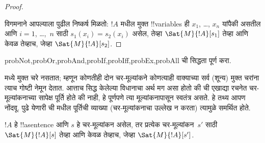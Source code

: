\documentclass[../../../include/open-logic-section]{subfiles}
\begin{document}
\begin{proof}
\begin{enumerate}
%
\end{enumerate}
विगमनाने आपल्याला पुढील निष्कर्ष मिळतो: $!A$ मधील मुक्त !!{variable}s
ही $x_1$, \dots, $x_n$ यांपैकी असतील आणि $i = 1$, \dots,~$n$ साठी
$s_1(x_i)=s_2(x_i)$ असेल, तेव्हा $\Sat{M}{!A}[s_1]$ तेव्हा आणि केवळ
तेव्हाच, जेव्हा $\Sat{M}{!A}[s_2]$.
\end{proof}

\begin{probtag}{probNot,probOr,probAnd,probIf,probIff,probEx,probAll}
 ची सिद्धता पूर्ण करा.
\end{probtag}

\begin{explain}
मध्ये मुक्त चरे नसतात; म्हणून कोणतीही दोन चर-मूल्यांकने
कोणत्याही वाक्याच्या सर्व (शून्य) मुक्त चरांना त्याच गोष्टी नेमून देतात.
आत्ताच सिद्ध केलेल्या विधानाचा अर्थ मग असा होतो की ची
एखाद्या रचनेत चर-मूल्यांकनाच्या सापेक्ष पूर्ति होते की नाही, हे पूर्णपणे
त्या मूल्यांकनापासून स्वतंत्र असते. हे तथ्य आपण नोंदवू. पुढे येणारी
ची मधील पूर्तिची व्याख्या (चर-मूल्यांकनाचा
उल्लेख न करता) त्यामुळे समर्थित होते.
\end{explain}

\begin{cor}
$!A$ हे !!a{sentence} आणि $s$ हे चर-मूल्यांकन असेल, तर प्रत्येक
चर-मूल्यांकन~$s'$ साठी $\Sat{M}{!A}[s]$ तेव्हा आणि केवळ तेव्हाच,
जेव्हा $\Sat{M}{!A}[s']$.
\end{cor}
\end{document}
